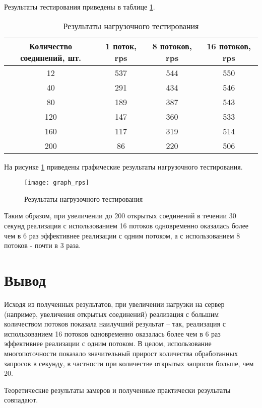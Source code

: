 Результаты тестирования приведены в таблице \ref{tbl:rps}.
\begin{table}[h]
	\begin{center}
		\begin{threeparttable}
		\caption{Результаты нагрузочного тестирования}
		\label{tbl:rps}
		\begin{tabular}{|c|c|c|c|}
			\hline
			Количество соединений, шт.& 1 поток, rps&  8 потоков, rps &  16 потоков, rps \\
			\hline
			12 & 537 & 544 & 550 \\ 
			\hline
			40 & 291 & 434 & 546 \\ 
			\hline
			80 & 189 & 387 & 543 \\ 
			\hline
			120 & 147 & 360 & 533 \\ 
			\hline
			160 & 117 & 319 & 514 \\ 
			\hline
			200 & 86 & 220 & 506 \\ 
			\hline
		\end{tabular}
		\end{threeparttable}
    \end{center}
\end{table}

На рисунке \ref{img:graph_rps} приведены графические результаты нагрузочного тестирования.

\begin{figure}[h]
	\begin{center}
		\texttt{[image: graph\_rps]}
	\end{center}
	\caption{Результаты нагрузочного тестирования}
	\label{img:graph_rps}
\end{figure}
Таким образом, при увеличении до 200 открытых соединений в течении 30 секунд реализация с использованием 16 потоков одновременно оказалась более чем в 6 раз эффективнее реализации с одним потоком, а с использованием 8 потоков - почти в 3 раза.

\section*{Вывод}
Исходя из полученных результатов, при увеличении нагрузки на сервер (например, увеличения открытых соединений) реализация с большим количеством потоков показала наилучший результат -- так, реализация с использованием 16 потоков одновременно оказалась более чем в 6 раз эффективнее реализации с одним потоком.
В целом, использование многопоточности показало значительный прирост количества обработанных запросов в секунду, в частности при количестве открытых запросов больше, чем 20.


Теоретические результаты замеров и полученные практически результаты совпадают.